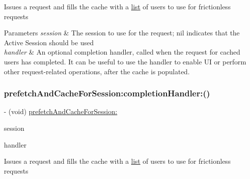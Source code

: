 Issues a request and fills the cache with a \hyperlink{protocollist-p}{list} of users to use for frictionless requests


\begin{DoxyParams}{Parameters}
{\em session} & The session to use for the request; nil indicates that the Active Session should be used\\
\hline
{\em handler} & An optional completion handler, called when the request for cached users has completed. It can be useful to use the handler to enable UI or perform other request-\/related operations, after the cache is populated. \\
\hline
\end{DoxyParams}
\mbox{\label{interfaceFBFrictionlessRecipientCache_a4c4c0f1fd519bfff5b39f3433fad29e3}} 
\subsubsection{\texorpdfstring{prefetch\+And\+Cache\+For\+Session\+:completion\+Handler\+:()}{prefetchAndCacheForSession:completionHandler:()}\hspace{0.1cm}{\footnotesize\ttfamily [2/5]}}
{\footnotesize\ttfamily -\/ (void) \hyperlink{interfaceFBFrictionlessRecipientCache_a4f218828f2b6a8bb5a8e0044e98689dc}{prefetch\+And\+Cache\+For\+Session\+:} \begin{DoxyParamCaption}\item[{(\hyperlink{interfaceFBSession}{F\+B\+Session} $\ast$)}]{session }\item[{completionHandler:(F\+B\+Request\+Handler)}]{handler }\end{DoxyParamCaption}}

Issues a request and fills the cache with a \hyperlink{protocollist-p}{list} of users to use for frictionless requests


